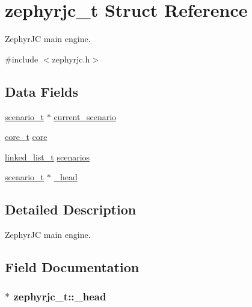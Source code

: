 \hypertarget{structzephyrjc__t}{}\section{zephyrjc\+\_\+t Struct Reference}
\label{structzephyrjc__t}


Zephyr\+JC main engine.  




{\ttfamily \#include $<$zephyrjc.\+h$>$}

\subsection*{Data Fields}
\begin{DoxyCompactItemize}
\item 
\hyperlink{structscenario__t}{scenario\+\_\+t} $\ast$ \hyperlink{structzephyrjc__t_a72c00754a438f734de92e2dfc26af6fd}{current\+\_\+scenario}
\item 
\hyperlink{structcore__t}{core\+\_\+t} \hyperlink{structzephyrjc__t_a800442229142f5481edfa1ef68828ed8}{core}
\item 
\hyperlink{structlinked__list__t}{linked\+\_\+list\+\_\+t} \hyperlink{structzephyrjc__t_a1a1b1b67ffc0bb743303ebebe105e7ad}{scenarios}
\item 
\hyperlink{structscenario__t}{scenario\+\_\+t} $\ast$ \hyperlink{structzephyrjc__t_afd66a9f9f995b6a6a21d4d429668c5ee}{\+\_\+head}
\end{DoxyCompactItemize}


\subsection{Detailed Description}
Zephyr\+JC main engine. 

\subsection{Field Documentation}
\subsubsection[{\texorpdfstring{\+\_\+head}{\_head}}]{$\ast$ zephyrjc\+\_\+t\+::\+\_\+head}\hypertarget{structzephyrjc__t_afd66a9f9f995b6a6a21d4d429668c5ee}{}\label{structzephyrjc__t_afd66a9f9f995b6a6a21d4d429668c5ee}

